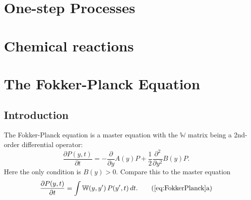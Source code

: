 \documentclass{book}
\numberwithin{equation}{section}
\theoremstyle{plain}
\theoremstyle{definition}
\theoremstyle{remark}
\theoremstyle{BoldStyle}
\numberwithin{exercise}{section}
\begin{document}
\chapter{One-step Processes}


\chapter{Chemical reactions}


\chapter{The Fokker-Planck Equation}

\section{Introduction}

The Fokker-Planck equation is a master equation with
the $\mathbb W$ matrix being a 2nd-order differential operator:
%
\begin{equation}
  \frac{ \partial P(y, t) }  { \partial t }
=
-\frac{\partial } {\partial y} A(y) P
+\frac{1}{2} \frac{ \partial^2 } { \partial y^2 } B(y) P.
\label{eq:FokkerPlanck}
\end{equation}
Here the only condition is $B(y) > 0$.
Compare this to the master equation
\begin{equation}
\frac{ \partial P(y, t) } { \partial t }
=
\int \mathbb W(y, y') \, P(y', t) \, dt.
\tag{\ref{eq:FokkerPlanck}a}
\label{eq:master_W}
\end{equation}
\end{document}
